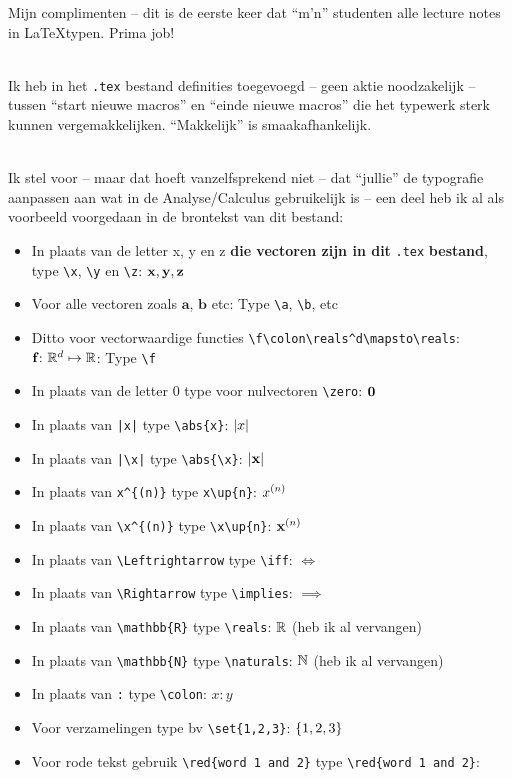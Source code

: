 \documentclass{2wa40summary}
\begin{document}
		Mijn complimenten -- dit is de eerste keer dat ``m'n'' studenten alle lecture notes in \LaTeX typen.
		Prima job!
		
		\ \\
		Ik heb in het \verb$.tex$ bestand definities toegevoegd -- geen aktie noodzakelijk -- tussen
		``start nieuwe macros'' en ``einde nieuwe macros'' die het
		typewerk sterk kunnen vergemakkelijken. ``Makkelijk'' is smaakafhankelijk.
		
		\ \\
		Ik stel voor -- maar dat hoeft vanzelfsprekend niet -- dat ``jullie'' de typografie aanpassen aan wat in de Analyse/Calculus gebruikelijk is -- een deel heb ik al als voorbeeld voorgedaan in de brontekst van dit bestand:
		\begin{itemize}
			\item In plaats van de letter x, y en z \textbf{die vectoren zijn in dit} \verb$.tex$ \textbf{bestand}, type
			\verb$\x$, \verb$\y$ en \verb$\z$: ${\textbf{x}}, {\textbf{y}}, {\textbf{z}}$
			\item Voor alle vectoren zoals $\mathbf{a}$, $\mathbf{b}$ etc: Type \verb$\a$, \verb$\b$, etc
			\item Ditto voor vectorwaardige functies \verb$\f\colon\reals^d\mapsto\reals$: ${\textbf{f}}\colon\mathbb{R}^d\mapsto\mathbb{R}$: Type \verb$\f$
			\item In plaats van de letter 0 type voor nulvectoren \verb$\zero$: ${\textbf{0}}$
			\item In plaats van \verb$|x|$ type \verb$\abs{x}$: ${\left|x\right|}$
			\item In plaats van \verb$|\x|$ type \verb$\abs{\x}$: ${\left|{\textbf{x}}\right|}$
			\item In plaats van \verb$x^{(n)}$ type \verb$x\up{n}$: $x^{(n)}$
			\item In plaats van \verb$\x^{(n)}$ type \verb$\x\up{n}$: ${\textbf{x}}^{(n)}$
			\item In plaats van \verb$\Leftrightarrow$ type \verb$\iff$: $\iff$
			\item In plaats van \verb$\Rightarrow$ type \verb$\implies$: $\implies$
			\item In plaats van \verb$\mathbb{R}$ type \verb$\reals$: $\mathbb{R}$ (heb ik al vervangen)
			\item In plaats van \verb$\mathbb{N}$ type \verb$\naturals$: $\mathbb{N}$ (heb ik al vervangen)
			\item In plaats van \verb$:$ type \verb$\colon$: $x\colon y$
			\item Voor verzamelingen type bv \verb$\set{1,2,3}$: $\lbrace1,2,3\rbrace$
			\item Voor rode tekst gebruik \verb$$ type \verb$\red{word 1 and 2}$: \red{word 1 and 2}

\end{itemize}
\end{document}
